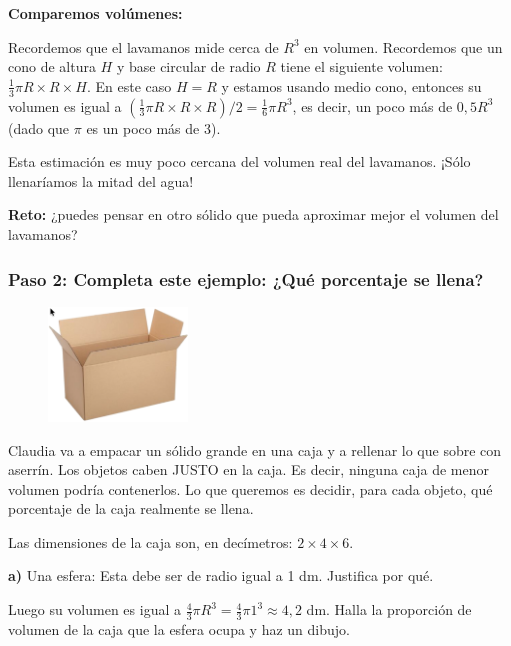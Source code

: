 \documentclass[12pt,a4paper]{article}
\begin{document}
\textbf{Comparemos volúmenes:}

Recordemos que el lavamanos mide cerca de $R^3$ en volumen. Recordemos que un cono de altura $H$ y base circular de radio $R$ tiene el siguiente volumen: $\frac{1}{3}\pi R \times R \times H$. En este caso $H = R$ y estamos usando medio cono, entonces su volumen es igual a $(\frac{1}{3}\pi R \times R \times R)/2 = \frac{1}{6}\pi R^3$, es decir, un poco más de $0,5 R^3$ (dado que $\pi$ es un poco más de 3).

Esta estimación es muy poco cercana del volumen real del lavamanos. ¡Sólo llenaríamos la mitad del agua!

\textbf{Reto:} ¿puedes pensar en otro sólido que pueda aproximar mejor el volumen del lavamanos?

\vspace{4mm}


\subsubsection*{Paso 2: Completa este ejemplo: ¿Qué porcentaje se llena?}

\begin{figure}
\centering
\vspace{-5pt}
\includegraphics[width=0.33\textwidth]{Figuras/fig31.png}
\vspace{-5pt}
\end{figure}

Claudia va a empacar un sólido grande en una caja y a rellenar lo que sobre con aserrín. Los objetos caben JUSTO en la caja. Es decir, ninguna caja de menor volumen podría contenerlos. Lo que queremos es decidir, para cada objeto, qué porcentaje de la caja realmente se llena.

Las dimensiones de la caja son, en decímetros: $2 \times 4 \times 6$.

\textbf{a)} Una esfera: Esta debe ser de radio igual a 1 dm. Justifica por qué.

Luego su volumen es igual a $\frac{4}{3}\pi R^3 = \frac{4}{3}\pi 1^3 \approx 4,2$ dm. Halla la proporción de volumen de la caja que la esfera ocupa y haz un dibujo.
\end{document}
